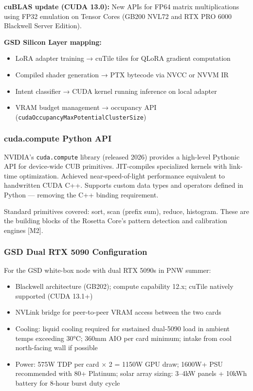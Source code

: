 \documentclass[11pt,letterpaper]{article}
\begin{document}
\textbf{cuBLAS update (CUDA 13.0):} New APIs for FP64 matrix multiplications using FP32 emulation on Tensor Cores (GB200 NVL72 and RTX PRO 6000 Blackwell Server Edition).

\textbf{GSD Silicon Layer mapping:}
\begin{itemize}[leftmargin=1.5em]
  \item LoRA adapter training → cuTile tiles for QLoRA gradient computation
  \item Compiled shader generation → PTX bytecode via NVCC or NVVM IR
  \item Intent classifier → CUDA kernel running inference on local adapter
  \item VRAM budget management → occupancy API (\texttt{cudaOccupancyMaxPotentialClusterSize})
\end{itemize}

\subsubsection{cuda.compute Python API}

NVIDIA's \texttt{cuda.compute} library (released 2026) provides a high-level Pythonic API for device-wide CUB primitives. JIT-compiles specialized kernels with link-time optimization. Achieved near-speed-of-light performance equivalent to handwritten CUDA C++. Supports custom data types and operators defined in Python --- removing the C++ binding requirement.

Standard primitives covered: sort, scan (prefix sum), reduce, histogram. These are the building blocks of the Rosetta Core's pattern detection and calibration engines [M2].

\subsubsection{GSD Dual RTX 5090 Configuration}

For the GSD white-box node with dual RTX 5090s in PNW summer:
\begin{itemize}[leftmargin=1.5em]
  \item Blackwell architecture (GB202); compute capability 12.x; cuTile natively supported (CUDA 13.1+)
  \item NVLink bridge for peer-to-peer VRAM access between the two cards
  \item Cooling: liquid cooling required for sustained dual-5090 load in ambient temps exceeding 30°C; 360mm AIO per card minimum; intake from cool north-facing wall if possible
  \item Power: 575W TDP per card × 2 = 1150W GPU draw; 1600W+ PSU recommended with 80+ Platinum; solar array sizing: 3--4kW panels + 10kWh battery for 8-hour burst duty cycle
\end{itemize}
\end{document}
